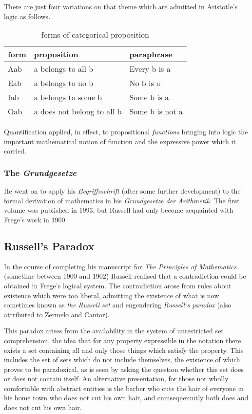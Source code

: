 \documentclass[10pt,titlepage]{article}
\begin{document}
There are just four variations on that theme which are admitted in Aristotle's logic as follows.

\begin{table}[h]
\begin{center}
  \caption{forms of categorical proposition}
\begin{tabular}{|l|l|l|}
\hline
form & proposition & paraphrase \\
\hline
Aab &	a belongs to all b & Every b is a \\
Eab &	a belongs to no b & No b is a \\
Iab &	a belongs to some b & Some b is a \\
Oab &	a does not belong to all b & Some b is not a \\
\hline
\end{tabular}
\end{center}
\end{table}

Quantification applied, in effect, to propositional {\it functions} bringing into logic the important mathematical notion of function and the expressive power which it carried.

\subsubsection{The {\it Grundgesetze}}

He went on to apply his {\it Begriffsschrift} (after some further development) to the formal derivation of mathematics in his \emph{Grundgesetze der Arithmetik}\cite{frege1893,frege1903}.
The first volume was published in 1993, but Russell had only become acquainted with Frege's work in 1900.

\subsection{Russell's Paradox}

In the course of completing his manuscript for \emph{The Principles of Mathematics} (sometime between 1900 and 1902) Russell realised that a contradiction could be obtained in Frege's logical system.
The contradiction arose from rules about existence which were too liberal, admitting the existence of what is now sometimes known as {\it the Russell set} and engendering {\it Russell's paradox} (also attributed to Zermelo and Cantor).

This paradox arises from the availability in the system of unrestricted set comprehension, the idea that for any property expressible in the notation there exists a set containing all and only those things which satisfy the property.
This includes the set of sets which do not include themselves, the existence of which proves to be paradoxical, as is seen by asking the question whether this set does or does not contain itself.
An alternative presentation, for those not wholly comfortable with abstract entities is the barber who cuts the hair of everyone in his home town who does not cut his own hair, and cnmsequenmtly both does and does not cut his own hair.
\end{document}
